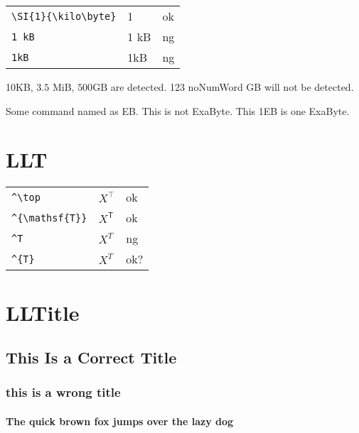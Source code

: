 \documentclass[a4paper]{article}
\newcommand{\tA}[1]{\textcolor{cA}{#1}}
\newcommand{\tC}[1]{\textcolor{cC}{#1}}
\newcommand{\tD}[1]{\textcolor{cD}{#1}}
\begin{document}
\begin{table}[H]
	\centering
	\begin{tabular}{lll}
		\verb|\SI{1}{\kilo\byte}| & \SI{1}{\kilo\byte} & \tA{ok} \\
		\verb|1 kB|               & 1 kB               & \tD{ng} \\
		\verb|1kB|                & 1kB                & \tD{ng} \\
	\end{tabular}
\end{table}

\newcommand{\EB}{Some command named as EB}

10KB, $3.5$ MiB, $500 \mathrm{GB}$ are detected. 123 noNumWord GB will not be detected.

\EB. This is not ExaByte. This 1EB is one ExaByte.

\section{LLT}

\begin{table}[H]
	\centering
	\begin{tabular}{lll}
		\verb|^\top|         & $X^\top$         & \tA{ok}  \\
		\verb|^{\mathsf{T}}| & $X^{\mathsf{T}}$ & \tA{ok}  \\
		\verb|^T|            & $X^T$            & \tD{ng}  \\
		\verb|^{T}|          & $X^{T}$          & \tC{ok?} \\
	\end{tabular}
\end{table}

\section{LLTitle}

\subsection{
	This Is a Correct Title
}

\subsubsection{this is a wrong title}

\paragraph{The quick brown fox jumps over the lazy dog}
\end{document}
